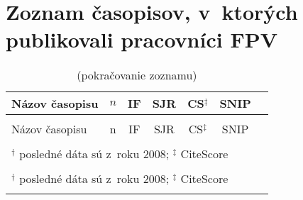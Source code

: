 \section*{Zoznam časopisov, v~ktorých publikovali pracovníci FPV}
\vspace{-0.5em}

{\small
\begin{longtable}[c]{lcccccc}
  \toprule\noalign{\vspace{.3ex}}
   Názov časopisu                                                                   & $n$ & IF & SJR  & CS$^\ddagger$ & SNIP           \\[0.3ex]
 \midrule\noalign{\vspace{.5ex}}
    \endfirsthead

    \caption*{(pokračovanie zoznamu)} \\
   \toprule\noalign{\vspace{.3ex}}
  Názov časopisu                                                                     & n & IF & SJR  & CS$^\ddagger$ & SNIP            \\[0.3ex]
 \midrule\noalign{\vspace{.5ex}}
    \endhead

    \bottomrule \\ [-2ex]
    \multicolumn{7}{l}{\footnotesize $^\dagger$ posledné dáta sú z~roku 2008; $^\ddagger$ CiteScore} \\
    \endfoot

  \bottomrule \\ [-2ex]
    \multicolumn{7}{l}{\footnotesize $^\dagger$ posledné dáta sú z~roku 2008; $^\ddagger$ CiteScore} \\
    \endlastfoot


\end{longtable}}
